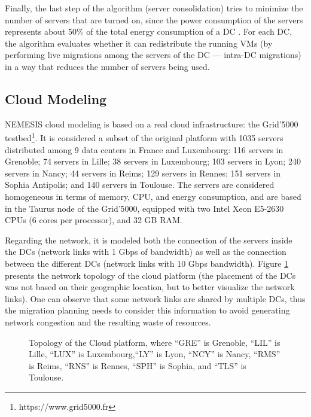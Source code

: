 Finally, the last step of the algorithm (server consolidation) tries to minimize the
number of servers that are turned on, since the power consumption of the servers represents about 50\% of the total
energy consumption of a DC \cite{power_to_the_people}. For each DC, the algorithm evaluates whether it can redistribute the running VMs (by performing live migrations among the servers of the DC --- intra-DC migrations)
in a way that reduces the number of servers being used.


\subsection{Cloud Modeling}\label{sec:cloud_model}

NEMESIS cloud modeling is based on a real cloud infrastructure:
the Grid'5000 testbed\footnote{https://www.grid5000.fr}. It is considered a subset of the original platform with
1035 servers distributed among 9 data centers in France and Luxembourg: 116 servers in Grenoble; 74
servers in Lille; 38 servers in Luxembourg; 103 servers in Lyon; 240
servers in Nancy; 44 servers in Reims;  129 servers in Rennes;  151
servers in Sophia Antipolis; and 140 servers in Toulouse. The servers are
considered homogeneous in terms of memory, CPU, and energy
consumption, and are based in the Taurus node of the Grid'5000, equipped
with two Intel Xeon E5-2630 CPUs (6 cores per processor), and 32 GB
RAM.

Regarding the network, it is modeled both the connection of the servers inside the DCs (network links with 1
Gbps of bandwidth) as well as the connection between the different DCs  (network links with 10 Gbps bandwidth). Figure \ref{fig:topology} presents the
network topology of the cloud platform (the placement of the DCs
was not based on their geographic location, but to better visualize
the network links). One can observe that some network links
are shared by multiple DCs, thus the migration planning needs to
consider this information to avoid generating network congestion and
the resulting waste of resources.

\begin{figure}[ht]
  \centering
   {}
  \caption{Topology of the Cloud platform, where ``GRE'' is Grenoble,  ``LIL'' is Lille, ``LUX'' is Luxembourg,``LY'' is Lyon, ``NCY'' is Nancy, ``RMS'' is Reims,  ``RNS'' is Rennes, ``SPH'' is Sophia, and  ``TLS'' is Toulouse.}
  \label{fig:topology}
 \end{figure}
 


